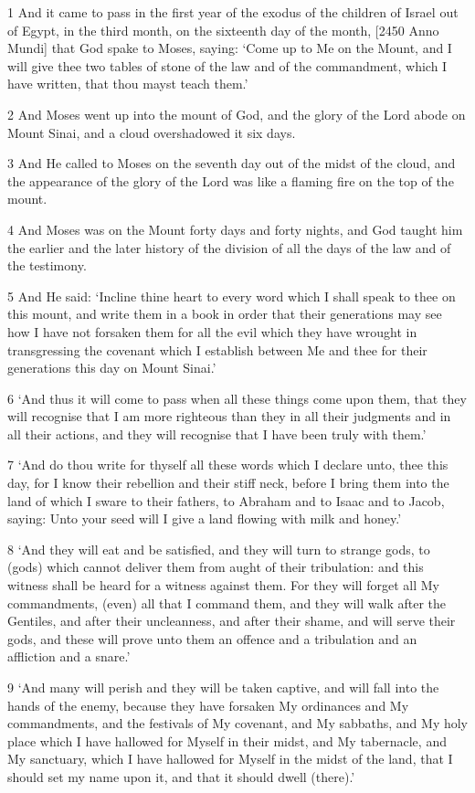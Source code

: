 \par 1 And it came to pass in the first year of the exodus of the children of Israel out of Egypt, in the third month, on the sixteenth day of the month, [2450 Anno Mundi] that God spake to Moses, saying: ‘Come up to Me on the Mount, and I will give thee two tables of stone of the law and of the commandment, which I have written, that thou mayst teach them.’
\par 2 And Moses went up into the mount of God, and the glory of the Lord abode on Mount Sinai, and a cloud overshadowed it six days.
\par 3 And He called to Moses on the seventh day out of the midst of the cloud, and the appearance of the glory of the Lord was like a flaming fire on the top of the mount.
\par 4 And Moses was on the Mount forty days and forty nights, and God taught him the earlier and the later history of the division of all the days of the law and of the testimony.
\par 5 And He said: ‘Incline thine heart to every word which I shall speak to thee on this mount, and write them in a book in order that their generations may see how I have not forsaken them for all the evil which they have wrought in transgressing the covenant which I establish between Me and thee for their generations this day on Mount Sinai.’
\par 6 ‘And thus it will come to pass when all these things come upon them, that they will recognise that I am more righteous than they in all their judgments and in all their actions, and they will recognise that I have been truly with them.’
\par 7 ‘And do thou write for thyself all these words which I declare unto, thee this day, for I know their rebellion and their stiff neck, before I bring them into the land of which I sware to their fathers, to Abraham and to Isaac and to Jacob, saying: Unto your seed will I give a land flowing with milk and honey.’
\par 8 ‘And they will eat and be satisfied, and they will turn to strange gods, to (gods) which cannot deliver them from aught of their tribulation: and this witness shall be heard for a witness against them. For they will forget all My commandments, (even) all that I command them, and they will walk after the Gentiles, and after their uncleanness, and after their shame, and will serve their gods, and these will prove unto them an offence and a tribulation and an affliction and a snare.’
\par 9 ‘And many will perish and they will be taken captive, and will fall into the hands of the enemy, because they have forsaken My ordinances and My commandments, and the festivals of My covenant, and My sabbaths, and My holy place which I have hallowed for Myself in their midst, and My tabernacle, and My sanctuary, which I have hallowed for Myself in the midst of the land, that I should set my name upon it, and that it should dwell (there).’
